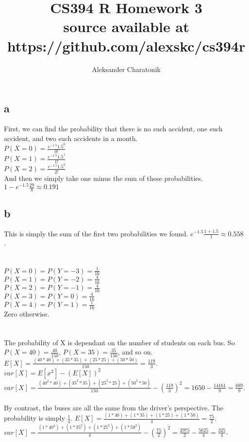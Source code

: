 \documentclass[12pt]{article}
\title{CS394 R Homework 3\\
\large source available at https://github.com/alexskc/cs394r}
\author{Aleksander Charatonik}
\begin{document}
\maketitle

\section{}
\subsection*{a}
First, we can find the probability that there is no such accident, one such accident, and two such accidents in a month.\\
\(P(X = 0) = \frac{e^{-1.5}1.5^0}{0!}\)\\
\(P(X = 1) = \frac{e^{-1.5}1.5^1}{1!}\)\\
\(P(X = 2) = \frac{e^{-1.5}1.5^2}{2!}\)\\
And then we simply take one minus the sum of these probabilities.
\(1-e^{-1.5}\frac{29}{8} \approx 0.191\)\\
\subsection*{b}
This is simply the sum of the first two probabilities we found.
\(e^{-1.5}\frac{1+1.5}{1} \approx 0.558\)\\.

\section{}
\(P(X = 0) = P(Y = -3) = \frac{1}{16}\)\\
\(P(X = 1) = P(Y = -2) = \frac{4}{16}\)\\
\(P(X = 2) = P(Y = -1) = \frac{4}{16}\)\\
\(P(X = 3) = P(Y = 0) = \frac{4}{16}\)\\
\(P(X = 4) = P(Y = 1) = \frac{1}{16}\)\\
Zero otherwise.

\section{}
The probability of X is dependant on the number of students on each bus. So \(P(X=40) = \frac{40}{150}\), \(P(X=35) = \frac{35}{150}\), and so on. \(E[X] = \frac{(40 * 40) + (35 * 35) + (25 * 25) + (50 * 50)}{150} = \frac{119}{3}\).\\
\(var[X] = E[x^2] - (E[X])^2\)\\
\(var[X] = \frac{(40^2 * 40) + (35^2 * 35) + (25^2 * 25) + (50^2 * 50)}{150} - (\frac{119}{3})^2 = 1650 - \frac{14161}{9} = \frac{689}{9}\).\\
\\
By contrast, the buses are all the same from the driver's perspective. The probability is simply \(\frac{1}{4}\). \(E[X] = \frac{(1 * 40) + (1*35) + (1 * 25) + (1 * 50)}{4} = \frac{75}{2}\).\\
\(var[X] = \frac{(1 * 40^2) + (1 * 35^2) + (1 * 25^2) + (1 * 50^2)}{4} - (\frac{75}{2})^2 = \frac{2975}{2} - \frac{5625}{4} = \frac{325}{4}\).
\end{document}
